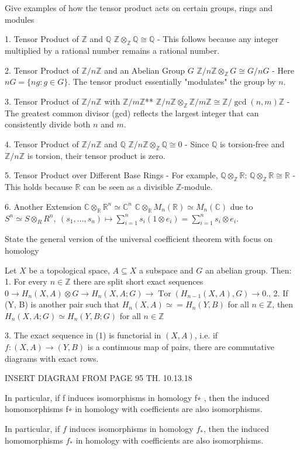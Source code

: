 Give examples of how the tensor product acts on certain groups, rings and modules

1. 
Tensor Product of \(\mathbb{Z}\) and \(\mathbb{Q}\)
\( \mathbb{Z} \otimes_{\mathbb{Z}} \mathbb{Q} \cong \mathbb{Q} \)
- This follows because any integer multiplied by a rational number remains a rational number.

2. Tensor Product of \(\mathbb{Z}/n\mathbb{Z}\) and an Abelian Group \(G\)
\(
\mathbb{Z}/n\mathbb{Z} \otimes_{\mathbb{Z}} G \cong G/nG
\)
- Here \(nG = \{ng : g \in G \}\). The tensor product essentially "modulates" the group by \(n\).

3. 
Tensor Product of \(\mathbb{Z}/n\mathbb{Z}\) with \(\mathbb{Z}/m\mathbb{Z}\)**
\(
\mathbb{Z}/n\mathbb{Z} \otimes_{\mathbb{Z}} \mathbb{Z}/m\mathbb{Z} \cong \mathbb{Z}/\gcd(n, m)\mathbb{Z}
\)
- The greatest common divisor (gcd) reflects the largest integer that can consistently divide both \(n\) and \(m\).

4. Tensor Product of \(\mathbb{Z}/n\mathbb{Z}\) and \(\mathbb{Q}\)
\(
\mathbb{Z}/n\mathbb{Z} \otimes_{\mathbb{Z}} \mathbb{Q} \cong 0
\)
- Since \(\mathbb{Q}\) is torsion-free and \(\mathbb{Z}/n\mathbb{Z}\) is torsion, their tensor product is zero.

5. Tensor Product over Different Base Rings
- For example, \(\mathbb{Q} \otimes_{\mathbb{Z}} \mathbb{R}\):
\(
\mathbb{Q} \otimes_{\mathbb{Z}} \mathbb{R} \cong \mathbb{R}
\)
- This holds because \(\mathbb{R}\) can be seen as a divisible \(\mathbb{Z}\)-module.

6. Another Extension
\( \mathbb{C} \otimes_{\mathbb{R}} \mathbb{R}^n \simeq \mathbb{C}^n \)
\( \mathbb{C} \otimes_{\mathbb{R}} M_n(\mathbb{R}) \simeq M_n(\mathbb{C}) \)
due to \( S^n \simeq S \otimes_R R^n,\ (s_1, \dots, s_n) \mapsto \sum_{i=1}^n s_i(1 \otimes e_i) = \sum_{i=1}^n s_i \otimes e_i \).

State the general version of the universal coefficient theorem with focus on homology

Let \( X \) be a topological space, \(A ⊆ X\)  a subspace and \( G \) an abelian group.
Then:
1. For every \( n \in \mathbb{Z} \) there are split short exact sequences
\(0 \longrightarrow H_{n}(X, A) \otimes G \longrightarrow H_n(X, A; G) \longrightarrow \operatorname{Tor}(H_{n-1}(X, A), G) \longrightarrow 0.\),
2. If (Y, B) is another pair such that \( H_n(X, A) \simeq = H_n(Y, B)\) for all \( n \in \mathbb{Z} \), then
\( H_n(X, A; G) \simeq H_n(Y, B; G)\) for all \( n \in \mathbb{Z}\)

3. The exact sequence in (1) is functorial in \( (X, A) \), i.e. if \( f : (X, A) \to (Y, B) \) is a 
continuous map of pairs, there are commutative diagrams with exact rows.

INSERT DIAGRAM FROM PAGE 95 TH. 10.13.18

In particular, if f induces isomorphisms in homology f∗ , then the induced homomorphisms
f∗ in homology with coefficients are also isomorphisms.

In particular, if \( f \) induces isomorphisms in homology \( f_\ast \), then the induced homomorphisms
\( f_\ast \) in homology with coefficients are also isomorphisms.
